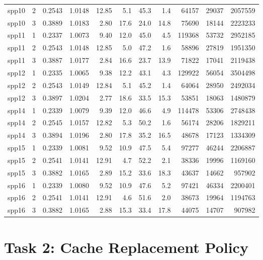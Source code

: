 \documentclass[11pt,a4paper]{article}
\theoremstyle{themethm}
\theoremstyle{themedef}
\theoremstyle{themeex}
\theoremstyle{themerem}
\begin{document}
\begin{longtable}{llrrrrrrrrr}
spp10 & 2 & 0.2543 & 1.0148 & 12.85 & 5.1 & 45.3 & 1.4 & 64157 & 29037 & 2057559 \\
spp10 & 3 & 0.3889 & 1.0183 & 2.80 & 17.6 & 24.0 & 14.8 & 75690 & 18144 & 2223233 \\
spp11 & 1 & 0.2337 & 1.0073 & 9.40 & 12.0 & 45.0 & 4.5 & 119368 & 53732 & 2952185 \\
spp11 & 2 & 0.2543 & 1.0148 & 12.85 & 5.0 & 47.2 & 1.6 & 58896 & 27819 & 1951350 \\
spp11 & 3 & 0.3887 & 1.0177 & 2.84 & 16.6 & 23.7 & 13.9 & 71822 & 17041 & 2119438 \\
spp12 & 1 & 0.2335 & 1.0065 & 9.38 & 12.2 & 43.1 & 4.3 & 129922 & 56054 & 3504498 \\
spp12 & 2 & 0.2543 & 1.0149 & 12.84 & 5.1 & 45.2 & 1.4 & 64064 & 28950 & 2492034 \\
spp12 & 3 & 0.3897 & 1.0204 & 2.77 & 18.6 & 33.5 & 15.3 & 53851 & 18063 & 1480879 \\
spp14 & 1 & 0.2339 & 1.0079 & 9.39 & 12.0 & 46.6 & 4.9 & 114478 & 53306 & 2748438 \\
spp14 & 2 & 0.2545 & 1.0157 & 12.82 & 5.3 & 50.2 & 1.6 & 56174 & 28206 & 1829211 \\
spp14 & 3 & 0.3894 & 1.0196 & 2.80 & 17.8 & 35.2 & 16.5 & 48678 & 17123 & 1334309 \\
spp15 & 1 & 0.2339 & 1.0081 & 9.52 & 10.9 & 47.5 & 5.4 & 97277 & 46244 & 2206887 \\
spp15 & 2 & 0.2541 & 1.0141 & 12.91 & 4.7 & 52.2 & 2.1 & 38336 & 19996 & 1169160 \\
spp15 & 3 & 0.3882 & 1.0165 & 2.89 & 15.2 & 33.6 & 18.3 & 43637 & 14662 & 957902 \\
spp16 & 1 & 0.2339 & 1.0080 & 9.52 & 10.9 & 47.6 & 5.2 & 97421 & 46334 & 2200401 \\
spp16 & 2 & 0.2541 & 1.0141 & 12.91 & 4.6 & 51.6 & 2.0 & 38673 & 19964 & 1194763 \\
spp16 & 3 & 0.3882 & 1.0165 & 2.88 & 15.3 & 33.4 & 17.8 & 44075 & 14707 & 907982 \\
\end{longtable}
\endgroup


\section{Task 2: Cache Replacement Policy}\label{sec:task2}
\end{document}
